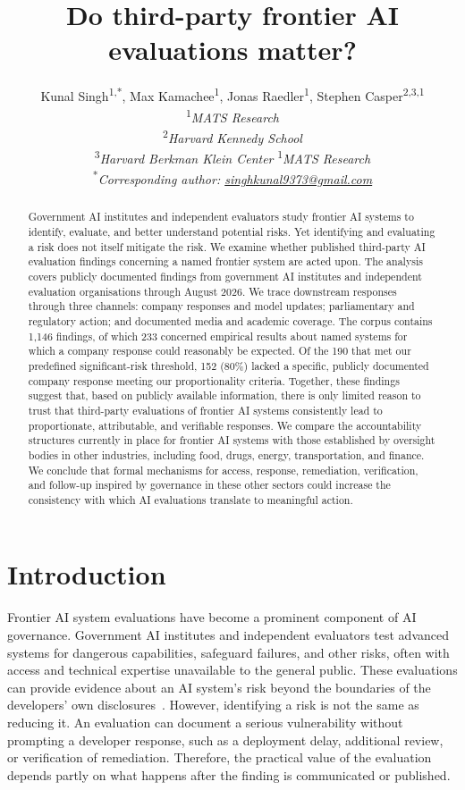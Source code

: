 \documentclass{article}
\title{Do third-party frontier AI evaluations matter?}
\author{%
  Kunal Singh\textsuperscript{1,*}, Max Kamachee\textsuperscript{1}, Jonas Raedler\textsuperscript{1}, Stephen Casper\textsuperscript{2,3,1}\\[0.55em]
  \normalfont\textsuperscript{1}\textit{MATS Research}\\
  \textsuperscript{2}\textit{Harvard Kennedy School}\\
  \textsuperscript{3}\textit{Harvard Berkman Klein Center}
  \normalfont\textsuperscript{1}\textit{MATS Research}\\[0.35em]
  \textsuperscript{*}\textit{Corresponding author: \href{mailto:singhkunal9373@gmail.com}{singhkunal9373@gmail.com}}
}
\begin{document}
\maketitle

\begin{abstract}
Government AI institutes and independent evaluators study frontier AI systems to identify, evaluate, and better understand potential risks. Yet identifying and evaluating a risk does not itself mitigate the risk. We examine whether published third-party AI evaluation findings concerning a named frontier system are acted upon. The analysis covers publicly documented findings from government AI institutes and independent evaluation organisations through August 2026. We trace downstream responses through three channels: company responses and model updates; parliamentary and regulatory action; and documented media and academic coverage. The corpus contains 1,146 findings, of which 233 concerned empirical results about named systems for which a company response could reasonably be expected. Of the 190 that met our predefined significant-risk threshold, 152 (80\%) lacked a specific, publicly documented company response meeting our proportionality criteria. Together, these findings suggest that, based on publicly available information, there is only limited reason to trust that third-party evaluations of frontier AI systems consistently lead to proportionate, attributable, and verifiable responses. We compare the accountability structures currently in place for frontier AI systems with those established by oversight bodies in other industries, including food, drugs, energy, transportation, and finance. We conclude that formal mechanisms for access, response, remediation, verification, and follow-up inspired by governance in these other sectors could increase the consistency with which AI evaluations translate to meaningful action.
\end{abstract}

\section{Introduction}\label{sec:introduction}
Frontier AI system evaluations have become a prominent component of AI governance. Government AI institutes and independent evaluators test advanced systems for dangerous capabilities, safeguard failures, and other risks, often with access and technical expertise unavailable to the general public. These evaluations can provide evidence about an AI system's risk beyond the boundaries of the developers' own disclosures~\citep{shevlane2023}. However, identifying a risk is not the same as reducing it. An evaluation can document a serious vulnerability without prompting a developer response, such as a deployment delay, additional review, or verification of remediation. Therefore, the practical value of the evaluation depends partly on what happens after the finding is communicated or published.
\end{document}
